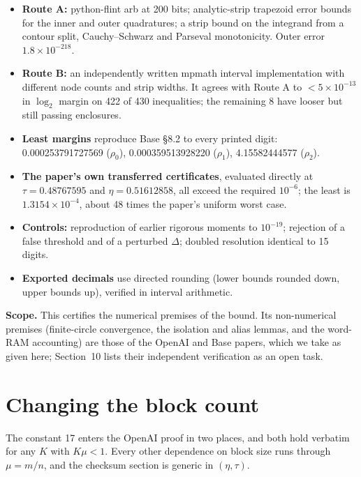 \documentclass[11pt]{article}
\theoremstyle{plain}
\begin{document}
\begin{itemize}
\item \textbf{Route A:} python-flint arb at 200 bits; analytic-strip trapezoid error bounds~\cite[Thm.~3.2]{tw} for the inner and outer quadratures; a strip bound on the integrand from a contour split, Cauchy--Schwarz and Parseval monotonicity. Outer error $1.8\times10^{-218}$.
\item \textbf{Route B:} an independently written mpmath interval implementation with different node counts and strip widths. It agrees with Route A to $< 5\times10^{-13}$ in $\log_2$ margin on 422 of 430 inequalities; the remaining 8 have looser but still passing enclosures.
\item \textbf{Least margins} reproduce Base \S8.2 to every printed digit: 0.000253791727569 ($\rho_0$), 0.000359513928220 ($\rho_1$), 4.15582444577 ($\rho_2$).
\item \textbf{The paper's own transferred certificates}, evaluated directly at $\tau = 0.48767595$ and $\eta = 0.51612858$, all exceed the required $10^{-6}$; the least is $1.3154\times10^{-4}$, about 48 times the paper's uniform worst case.
\item \textbf{Controls:} reproduction of earlier rigorous moments to $10^{-19}$; rejection of a false threshold and of a perturbed $\Delta$; doubled resolution identical to 15 digits.
\item \textbf{Exported decimals} use directed rounding (lower bounds rounded down, upper bounds up), verified in interval arithmetic.
\end{itemize}

\textbf{Scope.} This certifies the numerical premises of the bound. Its non-numerical premises (finite-circle convergence, the isolation and alias lemmas, and the word-RAM accounting) are those of the OpenAI and Base papers, which we take as given here; Section~10 lists their independent verification as an open task.

\section{Changing the block count}

The constant 17 enters the OpenAI proof in two places, and both hold verbatim for any $K$ with $K\mu < 1$. Every other dependence on block size runs through $\mu = m/n$, and the checksum section is generic in $(\eta, \tau)$.
\end{document}
